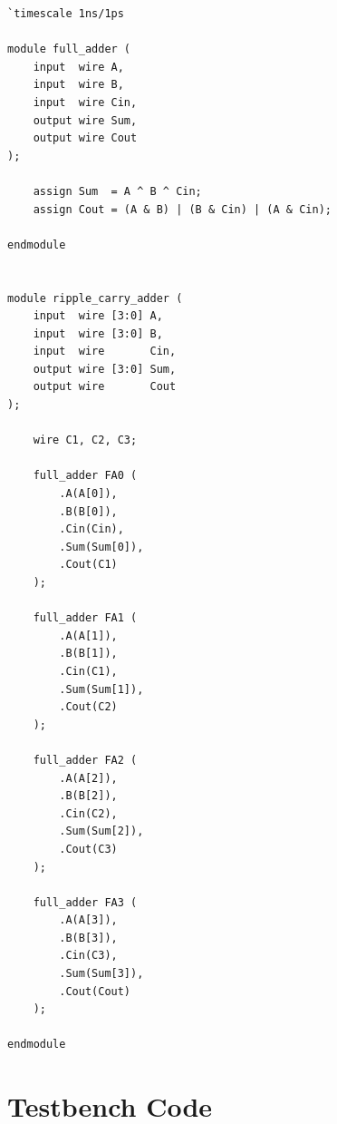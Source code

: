 \documentclass[12pt,a4paper]{report}
\begin{document}
\begin{verilogbox}
\begin{lstlisting}
`timescale 1ns/1ps

module full_adder (
    input  wire A,
    input  wire B,
    input  wire Cin,
    output wire Sum,
    output wire Cout
);

    assign Sum  = A ^ B ^ Cin;
    assign Cout = (A & B) | (B & Cin) | (A & Cin);

endmodule


module ripple_carry_adder (
    input  wire [3:0] A,
    input  wire [3:0] B,
    input  wire       Cin,
    output wire [3:0] Sum,
    output wire       Cout
);

    wire C1, C2, C3;

    full_adder FA0 (
        .A(A[0]),
        .B(B[0]),
        .Cin(Cin),
        .Sum(Sum[0]),
        .Cout(C1)
    );

    full_adder FA1 (
        .A(A[1]),
        .B(B[1]),
        .Cin(C1),
        .Sum(Sum[1]),
        .Cout(C2)
    );

    full_adder FA2 (
        .A(A[2]),
        .B(B[2]),
        .Cin(C2),
        .Sum(Sum[2]),
        .Cout(C3)
    );

    full_adder FA3 (
        .A(A[3]),
        .B(B[3]),
        .Cin(C3),
        .Sum(Sum[3]),
        .Cout(Cout)
    );

endmodule
\end{lstlisting}
\end{verilogbox}

\section{Testbench Code}
\end{document}
